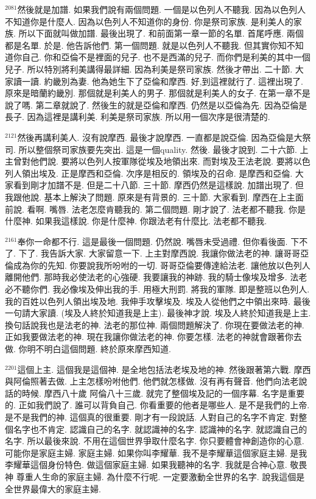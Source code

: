 \documentclass{book}
\begin{document}
$^{2081}$然後就是加譜.
如果我們說有兩個問題.
一個是以色列人不聽我.
因為以色列人不知道你是什麼人.
因為以色列人不知道你的身份.
你是祭司家族.
是利美人的家族.
所以下面就叫做加譜.
最後出現了.
和前面第一章一節的名單.
首尾呼應.
兩個都是名單.
於是.
他告訴他們.
第一個問題.
就是以色列人不聽我.
但其實你知不知道你自己.
你和亞倫不是裡面的兒子.
也不是西滿的兒子.
而你們是利美的其中一個兒子.
所以特別將利美講得最詳細.
因為利美是祭司家族.
然後才帶出.
二十節.
大家讀一讀.
約畿別為妻.
他為她生下了亞倫和摩西.
好,到這裡就行了.
這裡出現了.
原來是暗蘭約畿別.
那個就是利美人的男子.
那個就是利美人的女子.
在第一章不是說了嗎.
第二章就說了.
然後生的就是亞倫和摩西.
仍然是以亞倫為先.
因為亞倫是長子.
因為這裡是講利美.
利美是祭司家族.
所以用一個次序是很清楚的.

$^{2121}$然後再講利美人.
沒有說摩西.
最後才說摩西.
一直都是說亞倫.
因為亞倫是大祭司.
所以整個祭司家族要先突出.
這是一個quality.
然後.
最後才說到.
二十六節.
上主曾對他們說.
要將以色列人按軍隊從埃及地領出來.
而對埃及王法老說.
要將以色列人領出埃及.
正是摩西和亞倫.
次序是相反的.
領埃及的召命.
是摩西和亞倫.
大家看到剛才加譜不是.
但是二十八節.
三十節.
摩西仍然是這樣說.
加譜出現了.
但我跟他說.
基本上解決了問題.
原來是有背景的.
三十節.
大家看到.
摩西在上主面前說.
看啊.
嘴唇.
法老怎麼肯聽我的.
第二個問題.
剛才說了.
法老都不聽我.
你是什麼神.
如果我這樣說.
你是什麼神.
你跟法老有什麼比.
法老都不聽我.

$^{2161}$奉你一命都不行.
這是最後一個問題.
仍然說.
嘴唇未受過禮.
但你看後面.
下不了.
下了.
我告訴大家.
大家留意一下.
上主對摩西說.
我讓你做法老的神.
讓哥哥亞倫成為你的先知.
你要說我所吩咐的一切.
哥哥亞倫要傳達給法老.
讓他放以色列人離開他們.
那時我必使法老的心強硬.
我要讓我的神跡.
我的騎士像埃及增多.
法老必不聽你們.
我必像埃及伸出我的手.
用極大刑罰.
將我的軍隊.
即是整班以色列人.
我的百姓以色列人領出埃及地.
我伸手攻擊埃及.
埃及人從他們之中領出來時.
最後一句請大家讀.
(埃及人終於知道我是上主).
最後神才說.
埃及人終於知道我是上主.
換句話說我也是法老的神.
法老的那位神.
兩個問題解決了.
你現在要做法老的神.
正如我要做法老的神.
現在我讓你做法老的神.
你要怎樣.
法老的神就會跟著你去做.
你明不明白這個問題.
終於原來摩西知道.

$^{2201}$這個上主.
這個我是這個神.
是全地包括法老埃及地的神.
然後跟著第六戰.
摩西與阿倫照著去做.
上主怎樣吩咐他們.
他們就怎樣做.
沒有再有聲音.
他們向法老說話的時候.
摩西八十歲 阿倫八十三歲.
就完了整個埃及記的一個序幕.
名字是重要的.
正如我們說了.
誰可以背負自己.
你看重要的他者是哪些人.
是不是我們的上帝.
是不是我們的神.
這個真的很重要.
剛才有一段說話.
人對自己的名字不肯定.
對整個名字也不肯定.
認識自己的名字.
就認識神的名字.
認識神的名字.
就認識自己的名字.
所以最後來說.
不用在這個世界爭取什麼名字.
你只要體會神創造你的心意.
可能你是家庭主婦.
家庭主婦.
如果你叫李耀華.
我不是李耀華這個家庭主婦.
是我李耀華這個身份特色.
做這個家庭主婦.
如果我聽神的名字.
我就是合神心意.
敬畏神 尊重人生命的家庭主婦.
為什麼不行呢.
一定要激動全世界的名字.
說我這個是全世界最偉大的家庭主婦.
\end{document}
